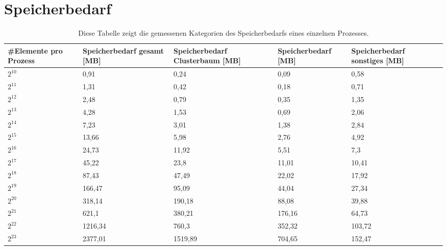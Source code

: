  \clearpage
  
  \section{Speicherbedarf}
  
  \begin{table}[b]
    \begin{tabular}{|P{2.3cm}|P{2.3cm}|P{2.3cm}|P{2.3cm}|P{2.3cm}|}
      \hline
      \#Elemente \newline pro Prozess & Speicherbedarf \newline gesamt [MB] & Speicherbedarf \newline Clusterbaum [MB] & Speicherbedarf \newline {} [MB] & Speicherbedarf \newline sonstiges [MB]\\
      \hline
      $2^{10}$	& 0,91    & 0,24    & 0,09    & 0,58	\\
      $2^{11}$	& 1,31    & 0,42    & 0,18    & 0,71	\\    
      $2^{12}$	& 2,48    & 0,79    & 0,35    & 1,35	\\
      $2^{13}$	& 4,28    & 1,53    & 0,69    & 2,06	\\
      $2^{14}$	& 7,23    & 3,01    & 1,38    & 2,84	\\
      $2^{15}$	& 13,66   & 5,98    & 2,76    & 4,92	\\
      $2^{16}$	& 24,73   & 11,92   & 5,51    & 7,3	\\
      $2^{17}$	& 45,22   & 23,8    & 11,01   & 10,41	\\
      $2^{18}$	& 87,43   & 47,49   & 22,02   & 17,92	\\
      $2^{19}$	& 166,47  & 95,09   & 44,04   & 27,34	\\
      $2^{20}$	& 318,14  & 190,18  & 88,08   & 39,88	\\
      $2^{21}$	& 621,1   & 380,21  & 176,16  & 64,73	\\
      $2^{22}$	& 1216,34 & 760,3   & 352,32  & 103,72	\\
      $2^{23}$	& 2377,01 & 1519,89 & 704,65  & 152,47	\\
      \hline
    \end{tabular}
    \caption{Diese Tabelle zeigt die gemessenen Kategorien des Speicherbedarfs eines einzelnen Prozesses.}
    \label{tab:mem}
  \end{table}

